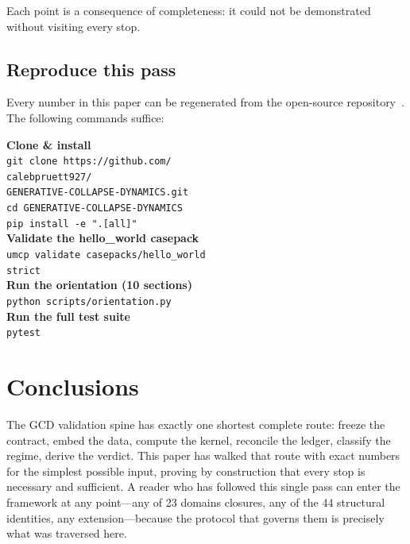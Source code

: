 \documentclass[
  aps,
  prd,
  twocolumn,
  superscriptaddress,
  nofootinbib,
  floatfix
]{revtex4-2}
\begin{document}
Each point is a consequence of completeness: it could not be
demonstrated without visiting every stop.

\subsection{Reproduce this pass}\label{sec:reproduce}

Every number in this paper can be regenerated from the open-source
repository~\cite{umcpmetadatarepo}.  The following commands suffice:

\begin{tcolorbox}[
  colback=black!4,
  colframe=black!60,
  boxrule=1.2pt,
  arc=2pt,
  left=6pt, right=6pt, top=6pt, bottom=6pt,
  title={\bfseries\sffamily Run This Now},
  coltitle=white,
  colbacktitle=black!70,
  fonttitle=\small,
]
\small
\textbf{Clone \& install}\\[2pt]
{\footnotesize\texttt{git clone https://github.com/\\\hspace*{1em}calebpruett927/\\\hspace*{1em}GENERATIVE-COLLAPSE-DYNAMICS.git}}\\[1pt]
\texttt{cd GENERATIVE-COLLAPSE-DYNAMICS}\\[1pt]
\texttt{pip install -e ".[all]"}\\[6pt]
%
\textbf{Validate the hello\_world casepack}\\[2pt]
\texttt{umcp validate casepacks/hello\_world} \\[1pt]
\texttt{\hspace*{2em}{-}{-}strict}\\[6pt]
%
\textbf{Run the orientation (10 sections)}\\[2pt]
\texttt{python scripts/orientation.py}\\[6pt]
%
\textbf{Run the full test suite}\\[2pt]
\texttt{pytest}
\end{tcolorbox}

\section{Conclusions}\label{sec:conclusions}

The GCD validation spine has exactly one shortest complete route:
freeze the contract, embed the data, compute the kernel, reconcile
the ledger, classify the regime, derive the verdict.  This paper
has walked that route with exact numbers for the simplest possible
input, proving by construction that every stop is necessary and
sufficient.  A reader who has followed this single pass can enter
the framework at any point---any of 23 domains closures, any of the
44 structural identities, any extension---because the protocol that
governs them is precisely what was traversed here.
\end{document}
